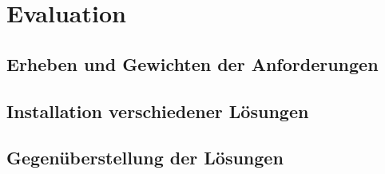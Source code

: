 
\section{Evaluation}

\subsection{Erheben und Gewichten der Anforderungen}




\subsection{Installation verschiedener Lösungen}






\subsection{Gegenüberstellung der Lösungen}



